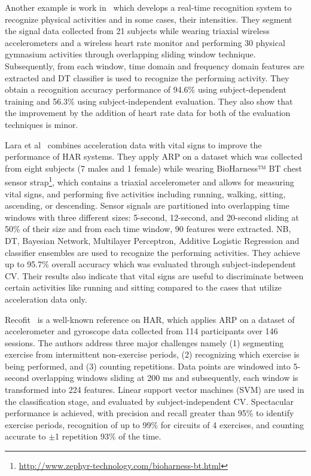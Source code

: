\documentclass[sensors,article,submit,moreauthors,pdftex]{Definitions/mdpi}
\begin{document}
Another example is work in~\cite{tapia2007real} which develops a real-time recognition system to recognize physical activities and in some cases, their intensities. They segment the signal data collected from 21 subjects while wearing triaxial wireless accelerometers and a wireless heart rate monitor and performing 30 physical gymnasium activities through overlapping sliding window technique. Subsequently, from each window, time domain and frequency domain features are extracted and DT classifier is used to recognize the performing activity. They obtain a
recognition accuracy performance of 94.6\% using
subject-dependent training and 56.3\% using subject-independent evaluation. They also show that the improvement by the addition of heart rate data for both of the evaluation techniques is minor. 

Lara et al~\cite{lara2012centinela} combines acceleration data with vital signs to improve the performance of HAR systems. They apply ARP on a dataset which was collected from eight subjects (7 males and 1 female) while wearing BioHarness™ BT chest sensor strap\footnote{\url{http://www.zephyr-technology.com/bioharness-bt.html}}, which contains a triaxial accelerometer and allows for measuring vital signs, and performing five activities including running, walking, sitting, ascending, or descending. Sensor signals are partitioned into overlapping time windows with three different sizes: 5-second, 12-second, and 20-second sliding at 50\% of their size and from each time window, 90 features were extracted. NB, DT, Bayesian Network, Multilayer Perceptron, Additive Logistic Regression and classifier ensembles are used to recognize the performing activities. They achieve up to 95.7\% overall accuracy which was evaluated through subject-independent CV. Their results also indicate that vital signs are useful to discriminate between certain activities like running and sitting compared to the cases that utilize acceleration data only.


Recofit~\cite{morris2014recofit} is a well-known reference on HAR, which applies ARP on a dataset of accelerometer and gyroscope data collected from 114 participants over 146 sessions. The authors address three major challenges namely (1) 
segmenting exercise from intermittent non-exercise periods, (2) 
recognizing which exercise is being performed, and (3) counting repetitions. Data points are windowed into 5-second overlapping windows sliding at 200 ms and subsequently, each window is transformed into 224 features. Linear support vector 
machines (SVM) are used in the classification stage, and evaluated by 
subject-independent CV. Spectacular performance is achieved, with precision and 
recall greater than 95\% to identify exercise periods, recognition 
of up to 99\% for circuits of 4 exercises, and counting  
accurate to $\pm$1 repetition 93\% of the time. 
\end{document}

